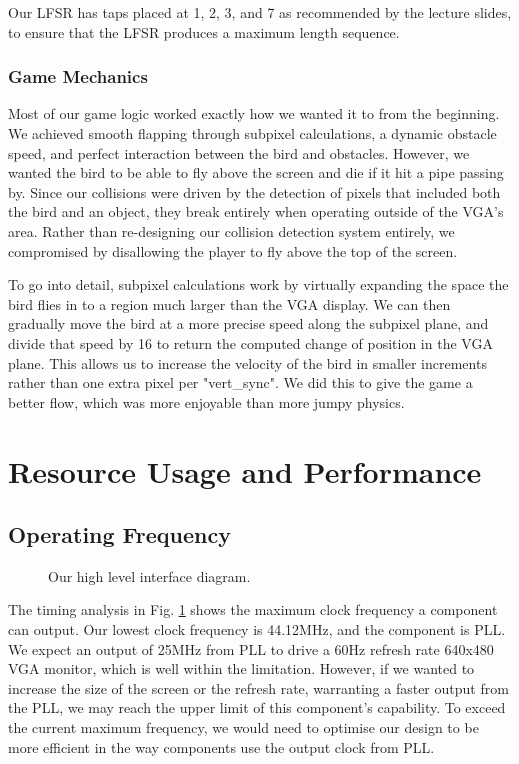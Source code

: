 \documentclass[conference]{IEEEtran}
\begin{document}
Our LFSR has taps placed at 1, 2, 3, and 7 as recommended by the lecture slides, to ensure that the LFSR produces a maximum length sequence.

\subsubsection{Game Mechanics}
Most of our game logic worked exactly how we wanted it to from the beginning. We achieved smooth flapping through subpixel calculations, a dynamic obstacle speed, and perfect interaction between the bird and obstacles. However, we wanted the bird to be able to fly above the screen and die if it hit a pipe passing by. Since our collisions were driven by the detection of pixels that included both the bird and an object, they break entirely when operating outside of the VGA's area. Rather than re-designing our collision detection system entirely, we compromised by disallowing the player to fly above the top of the screen.

To go into detail, subpixel calculations work by virtually expanding the space the bird flies in to a region much larger than the VGA display. We can then gradually move the bird at a more precise speed along the subpixel plane, and divide that speed by 16 to return the computed change of position in the VGA plane. This allows us to increase the velocity of the bird in smaller increments rather than one extra pixel per "vert\_sync". We did this to give the game a better flow, which was more enjoyable than more jumpy physics.

\section{Resource Usage and Performance}
\subsection{Operating Frequency}
\begin{figure}[htbp]
	\caption{Our high level interface diagram.}
	\label{fig:max-frequency}
\end{figure}

The timing analysis in Fig. \ref{fig:max-frequency} shows the maximum clock frequency a component can output. Our lowest clock frequency is 44.12MHz, and the component is PLL. We expect an output of 25MHz from PLL to drive a 60Hz refresh rate 640x480 VGA monitor, which is well within the limitation. However, if we wanted to increase the size of the screen or the refresh rate, warranting a faster output from the PLL, we may reach the upper limit of this component's capability. To exceed the current maximum frequency, we would need to optimise our design to be more efficient in the way components use the output clock from PLL.
\end{document}
